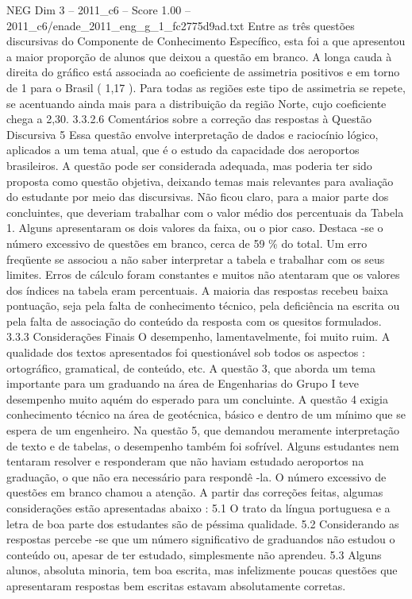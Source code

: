 \begin{textsample}{NEG Dim 3 – 2011\_c6 – Score 1.00 – 2011\_c6/enade\_2011\_eng\_g\_1\_fc2775d9ad.txt}
Entre as três questões discursivas do Componente de Conhecimento Específico, esta foi a que apresentou a maior proporção de alunos que deixou a questão em branco.
A longa cauda à direita do gráfico está associada ao coeficiente de assimetria positivos e em torno de 1 para o Brasil ( 1,17 ).
Para todas as regiões este tipo de assimetria se repete, se acentuando ainda mais para a distribuição da região Norte, cujo coeficiente chega a 2,30. 3.3.2.6 Comentários sobre a correção das respostas à Questão Discursiva 5 Essa questão envolve interpretação de dados e raciocínio lógico, aplicados a um tema atual, que é o estudo da capacidade dos aeroportos brasileiros.
A questão pode ser considerada adequada, mas poderia ter sido proposta como questão objetiva, deixando temas mais relevantes para avaliação do estudante por meio das discursivas.
Não ficou claro, para a maior parte dos concluintes, que deveriam trabalhar com o valor médio dos percentuais da Tabela 1.
Alguns apresentaram os dois valores da faixa, ou o pior caso.
Destaca -se o número excessivo de questões em branco, cerca de 59 \% do total.
Um erro freqüente se associou a não saber interpretar a tabela e trabalhar com os seus limites.
Erros de cálculo foram constantes e muitos não atentaram que os valores dos índices na tabela eram percentuais.
A maioria das respostas recebeu baixa pontuação, seja pela falta de conhecimento técnico, pela deficiência na escrita ou pela falta de associação do conteúdo da resposta com os quesitos formulados. 3.3.3 Considerações Finais O desempenho, lamentavelmente, foi muito ruim.
A qualidade dos textos apresentados foi questionável sob todos os aspectos : ortográfico, gramatical, de conteúdo, etc.
A questão 3, que aborda um tema importante para um graduando na área de Engenharias do Grupo I teve desempenho muito aquém do esperado para um concluinte.
A questão 4 exigia conhecimento técnico na área de geotécnica, básico e dentro de um mínimo que se espera de um engenheiro.
Na questão 5, que demandou meramente interpretação de texto e de tabelas, o desempenho também foi sofrível.
Alguns estudantes nem tentaram resolver e responderam que não haviam estudado aeroportos na graduação, o que não era necessário para respondê -la.
O número excessivo de questões em branco chamou a atenção.
A partir das correções feitas, algumas considerações estão apresentadas abaixo : 5.1 O trato da língua portuguesa e a letra de boa parte dos estudantes são de péssima qualidade. 5.2 Considerando as respostas percebe -se que um número significativo de graduandos não estudou o conteúdo ou, apesar de ter estudado, simplesmente não aprendeu. 5.3 Alguns alunos, absoluta minoria, tem boa escrita, mas infelizmente poucas questões que apresentaram respostas bem escritas estavam absolutamente corretas.

\end{textsample}
